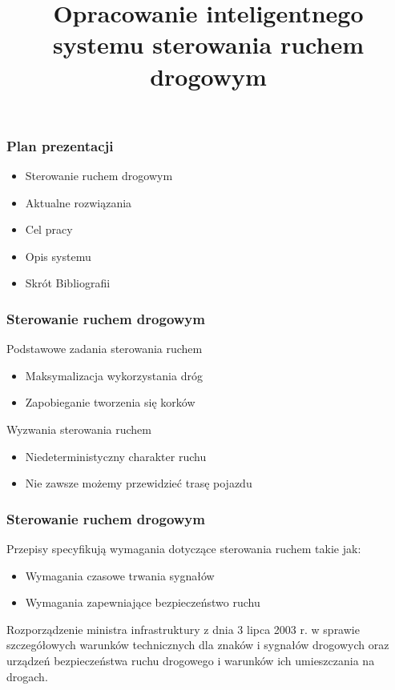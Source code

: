 \documentclass[17pt]{beamer}
\author{}
\title{Opracowanie inteligentnego systemu sterowania ruchem drogowym}
\subtitle{}
\date{}
\institute{autor: inż. Przemysław Rokosz\\\vspace{\baselineskip}promotor: dr inż. Grzegorz Filcek}
\begin{document}
\begin{frame}[plain,t]
 \maketitle
\end{frame}

\begin{frame}[shrink=5]
 \frametitle{\vspace{22px}Plan prezentacji}
 \begin{itemize}
  \item{Sterowanie ruchem drogowym}
  \item{Aktualne rozwiązania}
  \item{Cel pracy}
  \item{Opis systemu}
  \item{Skrót Bibliografii}
 \end{itemize}
\end{frame}

\begin{frame}[shrink=5]
 \frametitle{\vspace{22px}Sterowanie ruchem drogowym}
 Podstawowe zadania sterowania ruchem
 \begin{itemize}
  \item{Maksymalizacja wykorzystania dróg}
  \item{Zapobieganie tworzenia się korków}
 \end{itemize}
 Wyzwania sterowania ruchem
 \begin{itemize}
  \item{Niedeterministyczny charakter ruchu}
  \item{Nie zawsze możemy przewidzieć trasę pojazdu}
 \end{itemize}
\end{frame}

\begin{frame}
 \frametitle{\vspace{22px}Sterowanie ruchem drogowym}
 Przepisy specyfikują wymagania dotyczące sterowania ruchem takie jak:
 \begin{itemize}
  \item{Wymagania czasowe trwania sygnałów}
  \item{Wymagania zapewniające bezpieczeństwo ruchu}
 \end{itemize}
 {\tiny Rozporządzenie ministra infrastruktury z dnia 3 lipca 2003 r. w sprawie szczegółowych warunków technicznych
 dla znaków i sygnałów drogowych oraz urządzeń bezpieczeństwa ruchu drogowego i warunków ich umieszczania na drogach.}
\end{frame}
\end{document}
